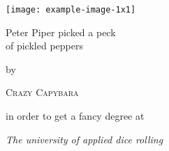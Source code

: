 \documentclass{report}
\begin{document}
\begin{titlepage}
	\begin{addmargin}[4cm]{-1cm}
		\centering
		\hfill\texttt{[image: example-image-1x1]}\par
		\vspace{4\baselineskip}
		{\Huge 
		Peter Piper picked a peck\\ of pickled peppers\par}
		\vspace{4\baselineskip}
		by\par\vspace{\baselineskip}
		{\Large\textsc{Crazy Capybara}\par}
		\vfill
		in order to get a fancy degree at\par
		{\em The university of applied dice rolling}
	\end{addmargin}
\end{titlepage}
\end{document}
